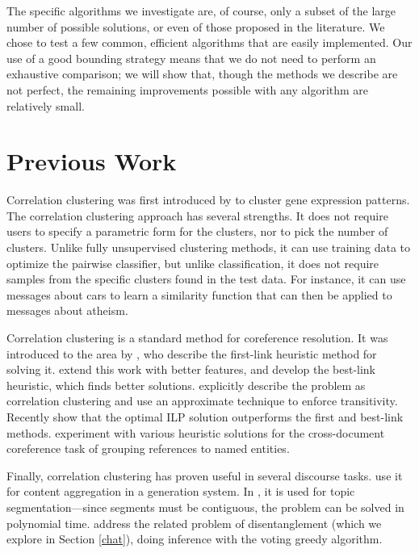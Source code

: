 \documentclass[11pt]{article}
\begin{document}
The specific algorithms we investigate are, of course, only a subset
of the large number of possible solutions, or even of those proposed
in the literature. We chose to test a few common, efficient algorithms
that are easily implemented. Our use of a good bounding strategy means
that we do not need to perform an exhaustive comparison; we will show
that, though the methods we describe are not perfect, the remaining
improvements possible with any algorithm are relatively small.

\section{Previous Work}

Correlation clustering was first introduced by  to cluster gene expression patterns.  The correlation
clustering approach has several strengths. It does not require users
to specify a parametric form for the clusters, nor to pick the number
of clusters. Unlike fully unsupervised clustering methods, it can use
training data to optimize the pairwise classifier, but unlike
classification, it does not require samples from the specific clusters
found in the test data. For instance, it can use messages about
cars to learn a similarity function that can then be applied to
messages about atheism.

Correlation clustering is a standard method for coreference
resolution. It was introduced to the area by , who
describe the first-link heuristic method for solving
it.  extend this work with better features, and develop
the best-link heuristic, which finds better
solutions.  explicitly describe the problem as
correlation clustering and use an approximate technique
\cite{Bansal04} to enforce transitivity. Recently 
show that the optimal ILP solution outperforms the first and best-link
methods.  experiment with various heuristic
solutions for the cross-document coreference task of grouping
references to named entities.

Finally, correlation clustering has proven useful in several discourse
tasks.  use it for content aggregation in a
generation system. In , it is used for topic
segmentation---since segments must be contiguous, the problem can be
solved in polynomial time.  address the related
problem of disentanglement (which we explore in Section \ref{chat}),
doing inference with the voting greedy algorithm.
\end{document}
